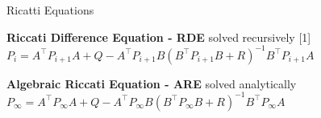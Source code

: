 
\begin{sstTitleBox}[ForestGreen]{{
				Ricatti Equations
			}
	}

	\begin{sstOnlyFrame}[ForestGreen]
		{\textbf{Riccati Difference Equation - RDE} solved recursively}
		\scalebox{0.97}[1]{$
				\scriptstyle
				P_i = A^\top P_{i+1} A
				+ Q - A^\top P_{i+1} B
				(B^\top P_{i+1} B + R)^{-1}
				B^\top P_{i+1} A$}
	\end{sstOnlyFrame}

	\begin{sstOnlyFrame}[ForestGreen]
		{\textbf{Algebraic Riccati Equation - ARE} solved analytically}
		{\center$\scriptstyle
				P_\infty = A^\top P_\infty A
				+ Q - A^\top P_\infty B
				(B^\top P_\infty B + R)^{-1}
				B^\top P_\infty A$}
	\end{sstOnlyFrame}

\end{sstTitleBox}
